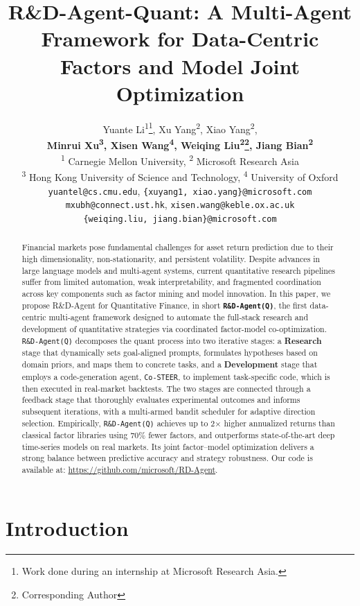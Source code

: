 \documentclass{article}
\title{R\&D-Agent-Quant: A Multi-Agent Framework for Data-Centric Factors and Model Joint Optimization}
\author{Yuante Li\textsuperscript{\rm 1}\thanks{Work done during an internship at Microsoft Research Asia.},\hspace{4pt} Xu Yang\textsuperscript{\rm 2},\hspace{4pt} Xiao Yang\textsuperscript{\rm 2}, \\
\textbf{Minrui Xu\textsuperscript{\rm 3}\footnotemark[1], \hspace{4pt}Xisen Wang\textsuperscript{\rm 4}\footnotemark[1], \hspace{4pt}Weiqing Liu\textsuperscript{\rm 2}\thanks{Corresponding Author}, \hspace{4pt}Jiang Bian\textsuperscript{\rm 2}} \\
\textsuperscript{\rm 1} Carnegie Mellon University, \textsuperscript{\rm 2} Microsoft Research Asia \\
\textsuperscript{\rm 3} Hong Kong University of Science and Technology,
\textsuperscript{\rm 4} University of Oxford \\
\texttt{yuantel@cs.cmu.edu},
\texttt{\{xuyang1, xiao.yang\}@microsoft.com}\\
\texttt{mxubh@connect.ust.hk},
\texttt{xisen.wang@keble.ox.ac.uk} \\
\texttt{\{weiqing.liu, jiang.bian\}@microsoft.com}
}
\newcommand{\name}{\texttt{R\&D-Agent(Q)}}
\begin{document}
\maketitle

\vspace{-0.6cm}
\begin{abstract}
    Financial markets pose fundamental challenges for asset return prediction due to their high dimensionality, non-stationarity, and persistent volatility.
    Despite advances in large language models and multi-agent systems, current quantitative research pipelines suffer from limited automation, weak interpretability, and fragmented coordination across key components such as factor mining and model innovation.
    In this paper, we propose R\&D-Agent for Quantitative Finance, in short \textbf{\name}, the first data-centric multi-agent framework designed to automate the full-stack research and development of quantitative strategies via coordinated factor-model co-optimization.
    \texttt{\name} decomposes the quant process into two iterative stages: a \textbf{Research} stage that dynamically sets goal-aligned prompts, formulates hypotheses based on domain priors, and maps them to concrete tasks, and a \textbf{Development} stage that employs a code-generation agent, \texttt{Co-STEER}, to implement task-specific code, which is then executed in real-market backtests. The two stages are connected through a feedback stage that thoroughly evaluates experimental outcomes and informs subsequent iterations, with a multi-armed bandit scheduler for adaptive direction selection.
    Empirically, \texttt{\name} achieves up to 2× higher annualized returns than classical factor libraries using 70\% fewer factors, and outperforms state-of-the-art deep time-series models on real markets. Its joint factor–model optimization delivers a strong balance between predictive accuracy and strategy robustness. Our code is available at: \url{https://github.com/microsoft/RD-Agent}.
\end{abstract}


\section{Introduction}
\end{document}
